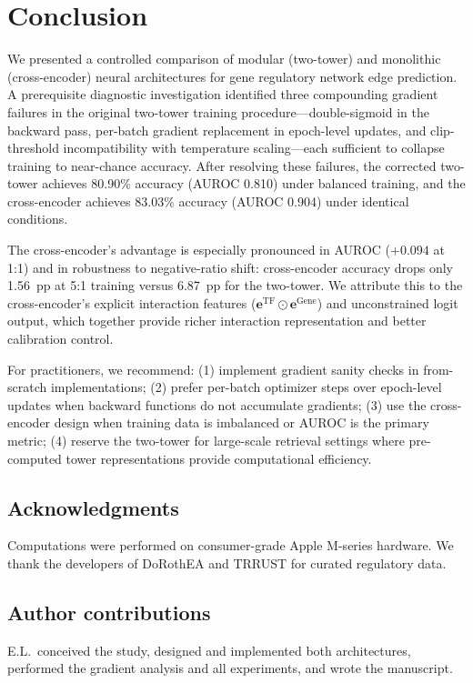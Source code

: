 \documentclass[10pt,twocolumn]{article}
\begin{document}
\section{Conclusion}
\label{sec:conclusion}

We presented a controlled comparison of modular (two-tower) and monolithic
(cross-encoder) neural architectures for gene regulatory network edge prediction.
A prerequisite diagnostic investigation identified three compounding gradient
failures in the original two-tower training procedure---double-sigmoid in the
backward pass, per-batch gradient replacement in epoch-level updates, and
clip-threshold incompatibility with temperature scaling---each sufficient to
collapse training to near-chance accuracy.
After resolving these failures, the corrected two-tower achieves 80.90\%
accuracy (AUROC 0.810) under balanced training, and the cross-encoder achieves
83.03\% accuracy (AUROC 0.904) under identical conditions.

The cross-encoder's advantage is especially pronounced in AUROC ($+0.094$ at
1:1) and in robustness to negative-ratio shift: cross-encoder accuracy drops
only 1.56~pp at 5:1 training versus 6.87~pp for the two-tower.
We attribute this to the cross-encoder's explicit interaction features
($\mathbf{e}^{\text{TF}} \odot \mathbf{e}^{\text{Gene}}$) and unconstrained
logit output, which together provide richer interaction representation and
better calibration control.

For practitioners, we recommend: (1) implement gradient sanity checks in
from-scratch implementations; (2) prefer per-batch optimizer steps over
epoch-level updates when backward functions do not accumulate gradients;
(3) use the cross-encoder design when training data is imbalanced or AUROC
is the primary metric; (4) reserve the two-tower for large-scale retrieval
settings where pre-computed tower representations provide computational efficiency.

\subsection*{Acknowledgments}
Computations were performed on consumer-grade Apple M-series hardware.
We thank the developers of DoRothEA and TRRUST for curated regulatory data.

\subsection*{Author contributions}
E.L.\ conceived the study, designed and implemented both architectures,
performed the gradient analysis and all experiments, and wrote the manuscript.
\end{document}
